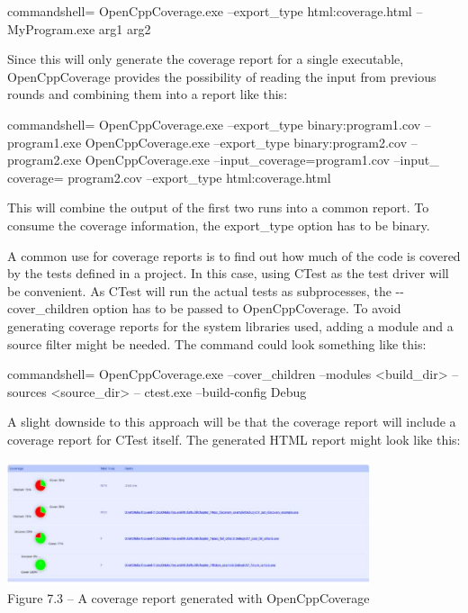 \begin{tcblisting}{commandshell={}}
OpenCppCoverage.exe --export_type html:coverage.html --
	MyProgram.exe arg1 arg2
\end{tcblisting}

Since this will only generate the coverage report for a single executable, OpenCppCoverage provides the possibility of reading the input from previous rounds and combining them into a report like this:

\begin{tcblisting}{commandshell={}}
OpenCppCoverage.exe --export_type binary:program1.cov --
	program1.exe
OpenCppCoverage.exe --export_type binary:program2.cov --
	program2.exe
OpenCppCoverage.exe --input_coverage=program1.cov --input_
coverage= program2.cov --export_type html:coverage.html
\end{tcblisting}

This will combine the output of the first two runs into a common report. To consume the coverage information, the export\_type option has to be binary.

A common use for coverage reports is to find out how much of the code is covered by the tests defined in a project. In this case, using CTest as the test driver will be convenient. As CTest will run the actual tests as subprocesses, the -{}-cover\_children option has to be passed to OpenCppCoverage. To avoid generating coverage reports for the system libraries used, adding a module and a source filter might be needed. The command could look something like this:

\begin{tcblisting}{commandshell={}}
OpenCppCoverage.exe --cover_children --modules <build_dir> --
	sources <source_dir> -- ctest.exe --build-config Debug
\end{tcblisting}

A slight downside to this approach will be that the coverage report will include a coverage report for CTest itself. The generated HTML report might look like this:

\begin{center}
\includegraphics[width=0.8\textwidth]{content/2/chapter7/images/3.jpg}\\
Figure 7.3 – A coverage report generated with OpenCppCoverage
\end{center}

